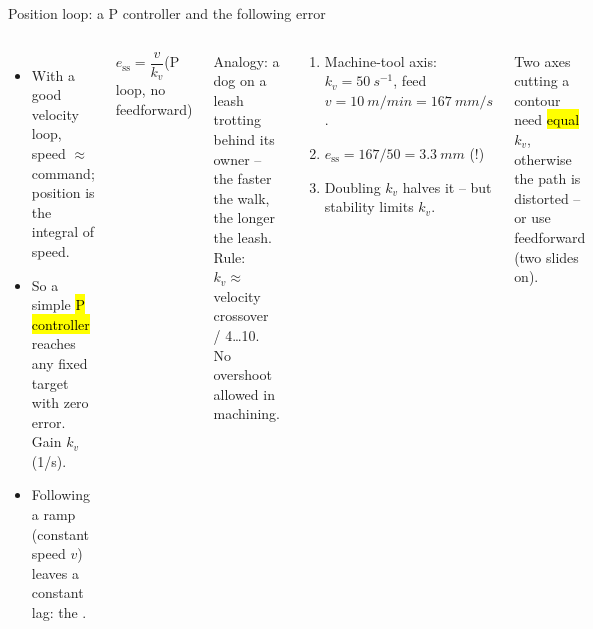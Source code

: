 \documentclass[aspectratio=169,10pt]{beamer}
\begin{document}
\begin{frame}[t]{Position loop: a P controller and the following error}
\begin{columns}[T,onlytextwidth]
\begin{itemize}\small
\item With a good velocity loop, speed $\approx$ command; position is the integral of speed.
\item So a simple \hl{P controller} reaches any fixed target with zero error. Gain $k_v$ (1/s).
\item Following a ramp (constant speed $v$) leaves a constant lag: the .
\end{itemize}
\begin{eqbox}\centering
$e_\text{ss}=\dfrac{v}{k_v}$\qquad (P loop, no feedforward)
\end{eqbox}
\small Analogy: a dog on a leash trotting behind its owner -- the faster the walk, the longer the leash.\\[1mm]
Rule: $k_v\approx$ velocity crossover / 4\ldots10. No overshoot allowed in machining.
\begin{defbox}
\small
\begin{enumerate}
\item Machine-tool axis: $k_v=\SI{50}{s^{-1}}$, feed $v=\SI{10}{m/min}=\SI{167}{mm/s}$.
\item $e_\text{ss}=167/50=\SI{3.3}{mm}$ (!)
\item Doubling $k_v$ halves it -- but stability limits $k_v$.
\end{enumerate}
\end{defbox}
\begin{notebox}
Two axes cutting a contour need \hl{equal} $k_v$, otherwise the path is distorted -- or use feedforward (two slides on).
\end{notebox}
\end{columns}
\end{frame}
\end{document}

